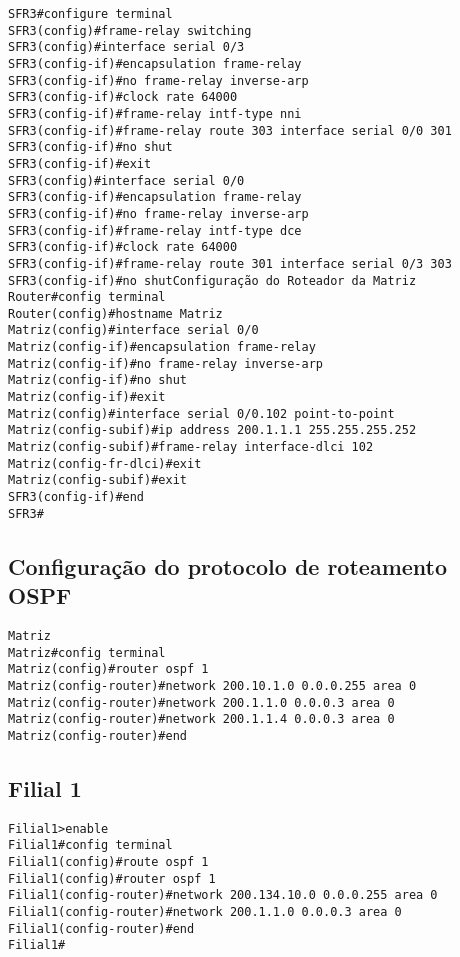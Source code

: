 \documentclass[]{article}
\begin{document}
\begin{verbatim}
SFR3#configure terminal
SFR3(config)#frame-relay switching
SFR3(config)#interface serial 0/3
SFR3(config-if)#encapsulation frame-relay
SFR3(config-if)#no frame-relay inverse-arp
SFR3(config-if)#clock rate 64000
SFR3(config-if)#frame-relay intf-type nni
SFR3(config-if)#frame-relay route 303 interface serial 0/0 301
SFR3(config-if)#no shut
SFR3(config-if)#exit
SFR3(config)#interface serial 0/0
SFR3(config-if)#encapsulation frame-relay
SFR3(config-if)#no frame-relay inverse-arp
SFR3(config-if)#frame-relay intf-type dce
SFR3(config-if)#clock rate 64000
SFR3(config-if)#frame-relay route 301 interface serial 0/3 303
SFR3(config-if)#no shutConfiguração do Roteador da Matriz
Router#config terminal
Router(config)#hostname Matriz
Matriz(config)#interface serial 0/0
Matriz(config-if)#encapsulation frame-relay
Matriz(config-if)#no frame-relay inverse-arp
Matriz(config-if)#no shut
Matriz(config-if)#exit
Matriz(config)#interface serial 0/0.102 point-to-point
Matriz(config-subif)#ip address 200.1.1.1 255.255.255.252
Matriz(config-subif)#frame-relay interface-dlci 102
Matriz(config-fr-dlci)#exit
Matriz(config-subif)#exit
SFR3(config-if)#end
SFR3#
\end{verbatim}

\hypertarget{configurauxe7uxe3o-do-protocolo-de-roteamento-ospf}{%
\subsection{Configuração do protocolo de roteamento
OSPF}\label{configurauxe7uxe3o-do-protocolo-de-roteamento-ospf}}

\begin{verbatim}
Matriz
Matriz#config terminal
Matriz(config)#router ospf 1
Matriz(config-router)#network 200.10.1.0 0.0.0.255 area 0
Matriz(config-router)#network 200.1.1.0 0.0.0.3 area 0
Matriz(config-router)#network 200.1.1.4 0.0.0.3 area 0
Matriz(config-router)#end
\end{verbatim}

\hypertarget{filial-1}{%
\subsection{Filial 1}\label{filial-1}}

\begin{verbatim}
Filial1>enable
Filial1#config terminal
Filial1(config)#route ospf 1
Filial1(config)#router ospf 1
Filial1(config-router)#network 200.134.10.0 0.0.0.255 area 0
Filial1(config-router)#network 200.1.1.0 0.0.0.3 area 0
Filial1(config-router)#end
Filial1#
\end{verbatim}
\end{document}
